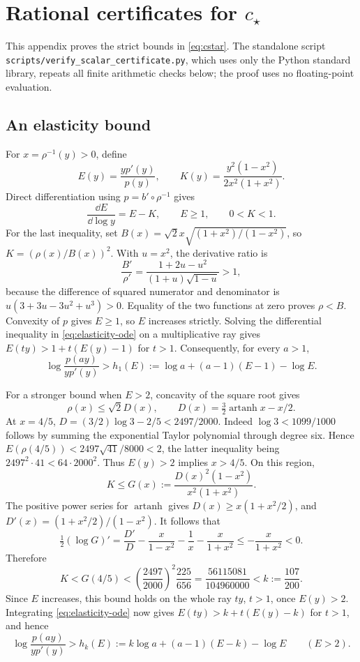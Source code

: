 \section{Rational certificates for \texorpdfstring{$c_\star$}{c*}}
\label{app:scalar-certificate}
This appendix proves the strict bounds in \eqref{eq:cstar}. The
standalone script \texttt{scripts/\allowbreak verify\_scalar\_\allowbreak certificate.py}, which
uses only the Python standard library, repeats all finite arithmetic
checks below; the proof uses no floating-point evaluation.

\subsection{An elasticity bound}
For $x=\rho^{-1}(y)>0$, define
\[
 E(y)=\frac{yp'(y)}{p(y)},\qquad
 K(y)=\frac{y^2(1-x^2)}{2x^2(1+x^2)}.
\]
Direct differentiation using $p=b'\circ\rho^{-1}$ gives
\begin{equation}
 \frac{\dd E}{\dd\log y}=E-K,\qquad E\geq1,
 \qquad 0<K<1.
 \label{eq:elasticity-ode}
\end{equation}
For the last inequality, set
$B(x)=\sqrt2x\sqrt{(1+x^2)/(1-x^2)}$, so $K=(\rho(x)/B(x))^2$.
With $u=x^2$, the derivative ratio is
\[
 \frac{B'}{\rho'}=\frac{1+2u-u^2}{(1+u)\sqrt{1-u}}>1,
\]
because the difference of squared numerator and denominator is
$u(3+3u-3u^2+u^3)>0$. Equality of the two functions at zero proves
$\rho<B$. Convexity of $p$ gives $E\geq1$, so $E$ increases strictly.
Solving the differential inequality in \eqref{eq:elasticity-ode} on a
multiplicative ray gives $E(ty)>1+t(E(y)-1)$ for $t>1$. Consequently,
for every $a>1$,
\begin{equation}
 \log\frac{p(ay)}{yp'(y)}>
 h_1(E):=\log a+(a-1)(E-1)-\log E.
 \label{eq:elasticity-first}
\end{equation}

For a stronger bound when $E>2$, concavity of the square root gives
\[
 \rho(x)\leq\sqrt2D(x),\qquad
 D(x)=\tfrac32\operatorname{artanh}x-x/2.
\]
At $x=4/5$, $D=(3/2)\log3-2/5<2497/2000$.
Indeed $\log3<1099/1000$ follows by summing the exponential Taylor
polynomial through degree six. Hence
$E(\rho(4/5))<2497\sqrt{41}/8000<2$, the latter inequality being
$2497^2\cdot41<64\cdot2000^2$. Thus $E(y)>2$ implies $x>4/5$.
On this region,
\[
 K\leq G(x):=\frac{D(x)^2(1-x^2)}{x^2(1+x^2)}.
\]
The positive power series for $\operatorname{artanh}$ gives
$D(x)\geq x(1+x^2/2)$, and
$D'(x)=(1+x^2/2)/(1-x^2)$. It follows that
\[
 \tfrac12(\log G)'=
 \frac{D'}D-\frac{x}{1-x^2}-\frac1x-\frac{x}{1+x^2}
 \leq-\frac{x}{1+x^2}<0.
\]
Therefore
\[
 K<G(4/5)<\left(\frac{2497}{2000}\right)^2\frac{225}{656}
 =\frac{56115081}{104960000}<k:=\frac{107}{200}.
\]
Since $E$ increases, this bound holds on the whole ray $ty$, $t>1$,
once $E(y)>2$.
Integrating \eqref{eq:elasticity-ode} now gives
$E(ty)>k+t(E(y)-k)$ for $t>1$, and hence
\begin{equation}
 \log\frac{p(ay)}{yp'(y)}>h_k(E):=
 k\log a+(a-1)(E-k)-\log E\qquad(E>2).
 \label{eq:elasticity-second}
\end{equation}

